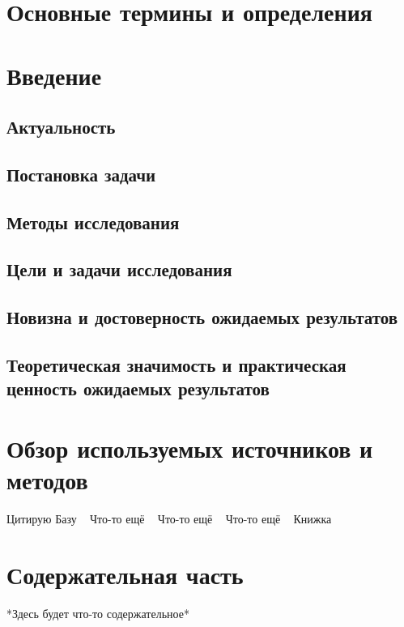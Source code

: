 \documentclass{article}
\begin{document}
\makeTitlePage
{
  \hypersetup{linkcolor=black}
  \tableofcontents
}


\section{Основные термины и определения}


\section{Введение}

\subsection*{Актуальность}
\subsection*{Постановка задачи}
\subsection*{Методы исследования}
\subsection*{Цели и задачи исследования}
\subsection*{Новизна и достоверность ожидаемых результатов}
\subsection*{Теоретическая значимость и практическая ценность ожидаемых результатов}


\section{Обзор используемых источников и методов}
Цитирую
Базу ~\cite{Base}
Что-то ещё ~\cite{Tandle}
Что-то ещё ~\cite{Scherer}
Что-то ещё ~\cite{Fernandez-Sotos}
Книжка ~\cite{Koelsch}

\section{Содержательная часть}

*Здесь будет что-то содержательное*
\end{document}
